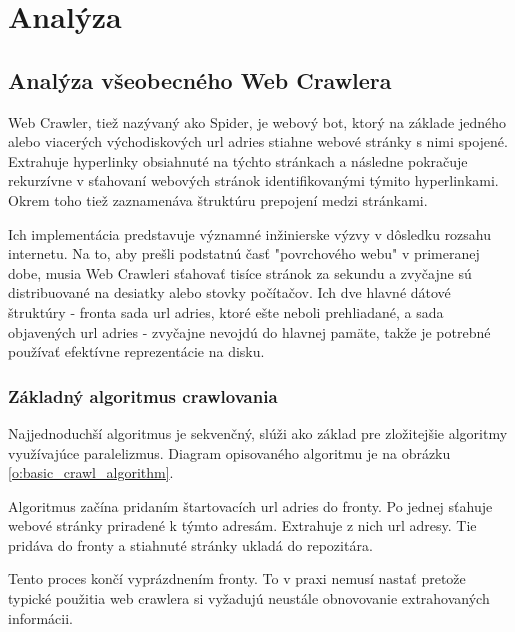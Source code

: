 

\chapter{Analýza}
\section{Analýza všeobecného Web Crawlera}

Web Crawler, tiež nazývaný ako Spider, je webový bot, ktorý na základe jedného alebo viacerých východiskových \acrshort{url} adries stiahne webové stránky s nimi spojené. Extrahuje hyperlinky obsiahnuté na týchto stránkach a následne pokračuje rekurzívne v sťahovaní webových stránok identifikovanými týmito hyperlinkami. Okrem toho tiež zaznamenáva štruktúru prepojení medzi stránkami. \cite{introToInfRetrieval}

Ich implementácia predstavuje významné inžinierske výzvy v dôsledku rozsahu internetu. Na to, aby prešli podstatnú časť "povrchového webu" v primeranej dobe, musia Web Crawleri sťahovať tisíce stránok za sekundu a zvyčajne sú distribuované na desiatky alebo stovky počítačov. Ich dve hlavné dátové štruktúry - fronta sada \acrshort{url}  adries, ktoré ešte neboli prehliadané, a sada objavených \acrshort{url}  adries - zvyčajne nevojdú do hlavnej pamäte, takže je potrebné používať efektívne reprezentácie na disku. \cite{encykOfDatabases}

\subsection{Základný algoritmus crawlovania}\label{sub:zakladnyAlgoritmusCrawlovania}
Najjednoduchší algoritmus je sekvenčný, slúži ako základ pre zložitejšie algoritmy využívajúce paralelizmus. Diagram opisovaného algoritmu je na obrázku \ref{o:basic_crawl_algorithm}.

Algoritmus začína pridaním štartovacích \acrshort{url}  adries do fronty. Po jednej sťahuje webové stránky priradené k týmto adresám. Extrahuje z nich \acrshort{url}  adresy. Tie pridáva do fronty a stiahnuté stránky ukladá do repozitára.

Tento proces končí vyprázdnením fronty. To v praxi nemusí nastať pretože typické použitia web crawlera si vyžadujú neustále obnovovanie extrahovaných informácii.

